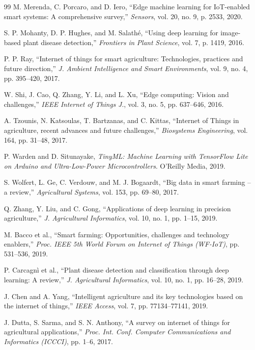 \documentclass[10pt,twocolumn]{article}
\begin{document}
\begin{thebibliography}{99}
 M. Merenda, C. Porcaro, and D. Iero, ``Edge machine learning for IoT-enabled smart systems: A comprehensive survey,'' \textit{Sensors}, vol. 20, no. 9, p. 2533, 2020.

 S. P. Mohanty, D. P. Hughes, and M. Salathé, ``Using deep learning for image-based plant disease detection,'' \textit{Frontiers in Plant Science}, vol. 7, p. 1419, 2016.

 P. P. Ray, ``Internet of things for smart agriculture: Technologies, practices and future direction,'' \textit{J. Ambient Intelligence and Smart Environments}, vol. 9, no. 4, pp. 395--420, 2017.

 W. Shi, J. Cao, Q. Zhang, Y. Li, and L. Xu, ``Edge computing: Vision and challenges,'' \textit{IEEE Internet of Things J.}, vol. 3, no. 5, pp. 637--646, 2016.

 A. Tzounis, N. Katsoulas, T. Bartzanas, and C. Kittas, ``Internet of Things in agriculture, recent advances and future challenges,'' \textit{Biosystems Engineering}, vol. 164, pp. 31--48, 2017.

 P. Warden and D. Situnayake, \textit{TinyML: Machine Learning with TensorFlow Lite on Arduino and Ultra-Low-Power Microcontrollers}. O'Reilly Media, 2019.

 S. Wolfert, L. Ge, C. Verdouw, and M. J. Bogaardt, ``Big data in smart farming -- a review,'' \textit{Agricultural Systems}, vol. 153, pp. 69--80, 2017.

 Q. Zhang, Y. Liu, and C. Gong, ``Applications of deep learning in precision agriculture,'' \textit{J. Agricultural Informatics}, vol. 10, no. 1, pp. 1--15, 2019.

 M. Bacco et al., ``Smart farming: Opportunities, challenges and technology enablers,'' \textit{Proc. IEEE 5th World Forum on Internet of Things (WF-IoT)}, pp. 531--536, 2019.

 P. Carcagnì et al., ``Plant disease detection and classification through deep learning: A review,'' \textit{J. Agricultural Informatics}, vol. 10, no. 1, pp. 16--28, 2019.

 J. Chen and A. Yang, ``Intelligent agriculture and its key technologies based on the internet of things,'' \textit{IEEE Access}, vol. 7, pp. 77134--77141, 2019.

 J. Dutta, S. Sarma, and S. N. Anthony, ``A survey on internet of things for agricultural applications,'' \textit{Proc. Int. Conf. Computer Communications and Informatics (ICCCI)}, pp. 1--6, 2017.


\end{thebibliography}
\end{document}
